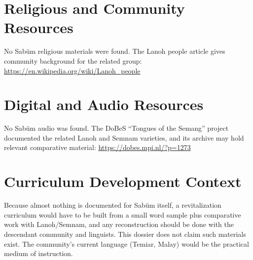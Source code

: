\documentclass[12pt]{article}
\begin{document}
\section{Religious and Community Resources}
No Sab\"um religious materials were found. The Lanoh people article gives community background for the related group: \url{https://en.wikipedia.org/wiki/Lanoh_people}

\section{Digital and Audio Resources}
No Sab\"um audio was found. The DoBeS ``Tongues of the Semang'' project documented the related Lanoh and Semnam varieties, and its archive may hold relevant comparative material: \url{https://dobes.mpi.nl/?p=1273}

\section{Curriculum Development Context}
Because almost nothing is documented for Sab\"um itself, a revitalization curriculum would have to be built from a small word sample plus comparative work with Lanoh/Semnam, and any reconstruction should be done with the descendant community and linguists. This dossier does not claim such materials exist. The community's current language (Temiar, Malay) would be the practical medium of instruction.
\end{document}
